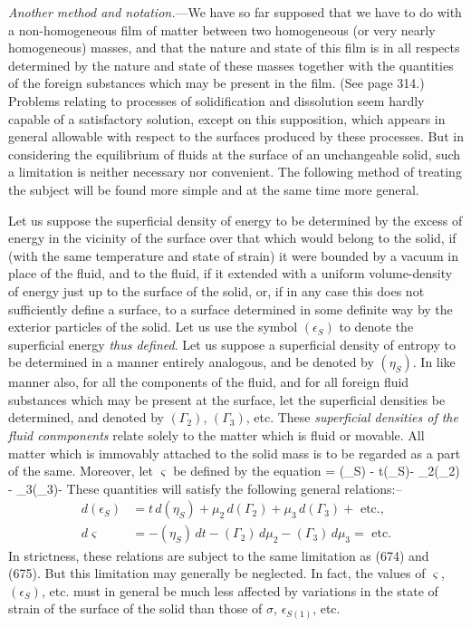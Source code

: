 \documentclass[12pt]{article}
\begin{document}
\textit{Another method and notation.}---We have so far supposed that we have to do with a non-homogeneous film of matter between two homogeneous (or very nearly homogeneous) masses, and that the nature and state of this film is in all respects determined by the nature and state of these masses together with the quantities of the foreign substances which may be present in the film. (See page 314.) Problems relating to processes of solidification and dissolution seem hardly capable of a satisfactory solution, except on this supposition, which appears in general allowable with respect to the surfaces produced by these processes. But in considering the equilibrium of fluids at the surface of an unchangeable solid, such a limitation is neither necessary nor convenient. The following method of treating the subject will be found more simple and at the same time more general.

Let us suppose the superficial density of energy to be determined by the excess of energy in the vicinity of the surface over that which would belong to the solid, if (with the same temperature and state of strain) it were bounded by a vacuum in place of the fluid, and to the fluid, if it extended with a uniform volume-density of energy just up to the surface of the solid, or, if in any case this does not sufficiently define a surface, to a surface determined in some definite way by the exterior particles of the solid. Let us use the symbol $(\epsilon_S)$ to denote the superficial energy \textit{thus defined}. Let us suppose a superficial density of entropy to be determined in a manner entirely analogous, and be denoted by $(\eta_S)$. In like manner also, for all the components of the fluid, and for all foreign fluid substances which may be present at the surface, let the superficial densities be determined, and denoted by $(\Gamma_2)$, $(\Gamma_3)$, etc. These \textit{superficial densities of the fluid conmponents} relate solely to the matter which is fluid or movable. All matter which is immovably attached to the solid mass is to be regarded as a part of the same. Moreover, let $\varsigma$ be defined by the equation
\eqs \varsigma = (\epsilon_S) - t(\eta_S)- \mu_2(\Gamma_2) - \mu_3(\Gamma_3)-     \label{676} \eqe
These quantities will satisfy the following general relations:--
\begin{align}
d(\epsilon_S) &= t\, d(\eta_S)+ \mu_2\, d (\Gamma_2) + \mu_3\, d (\Gamma_3) + \text{ etc.}, \label{677} \\
d \varsigma &= - (\eta_S)\, dt -(\Gamma_2)\, d \mu_2 -  (\Gamma_3)\, d \mu_3 = \text{ etc.}  \label{677} \end{align}
In strictness, these relations are subject to the same limitation as (674) and (675). But this limitation may generally be neglected. In fact, the values of $\varsigma$, $(\epsilon_S)$, etc. must in general be much less affected by variations in the state of strain of the surface of the solid than those of $\sigma$, $\epsilon_{S(1)}$, etc.
\end{document}
